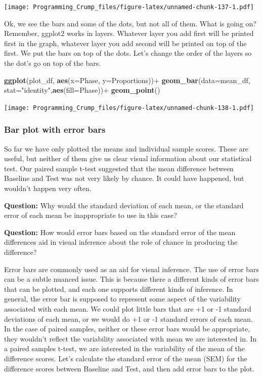 \documentclass[]{book}
\newenvironment{Shaded}{\begin{snugshade}}{\end{snugshade}}
\newcommand{\KeywordTok}[1]{\textcolor[rgb]{0.13,0.29,0.53}{\textbf{{#1}}}}
\newcommand{\DataTypeTok}[1]{\textcolor[rgb]{0.13,0.29,0.53}{{#1}}}
\newcommand{\StringTok}[1]{\textcolor[rgb]{0.31,0.60,0.02}{{#1}}}
\newcommand{\NormalTok}[1]{{#1}}
\theoremstyle{definition}
\theoremstyle{definition}
\theoremstyle{definition}
\theoremstyle{remark}
\begin{document}
\texttt{[image: Programming\_Crump\_files/figure-latex/unnamed-chunk-137-1.pdf]}

Ok, we see the bars and some of the dots, but not all of them. What is
going on? Remember, ggplot2 works in layers. Whatever layer you add
first will be printed first in the graph, whatever layer you add second
will be printed on top of the first. We put the bars on top of the dots.
Let's change the order of the layers so the dot's go on top of the bars.

\begin{Shaded}
\begin{Highlighting}[]
\KeywordTok{ggplot}\NormalTok{(plot_df, }\KeywordTok{aes}\NormalTok{(}\DataTypeTok{x=}\NormalTok{Phase, }\DataTypeTok{y=}\NormalTok{Proportions))+}\StringTok{ }
\StringTok{  }\KeywordTok{geom_bar}\NormalTok{(}\DataTypeTok{data=}\NormalTok{mean_df, }\DataTypeTok{stat=}\StringTok{"identity"}\NormalTok{,}\KeywordTok{aes}\NormalTok{(}\DataTypeTok{fill=}\NormalTok{Phase))+}
\StringTok{  }\KeywordTok{geom_point}\NormalTok{()}
\end{Highlighting}
\end{Shaded}

\texttt{[image: Programming\_Crump\_files/figure-latex/unnamed-chunk-138-1.pdf]}

\subsubsection{Bar plot with error bars}\label{bar-plot-with-error-bars}

So far we have only plotted the means and individual sample scores.
These are useful, but neither of them give us clear visual information
about our statistical test. Our paired sample t-test suggested that the
mean difference between Baseline and Test was not very likely by chance.
It could have happened, but wouldn't happen very often.

\textbf{Question:} Why would the standard deviation of each mean, or the
standard error of each mean be inappropriate to use in this case?

\textbf{Question:} How would error bars based on the standard error of
the mean differences aid in visual inference about the role of chance in
producing the difference?

Error bars are commonly used as an aid for visual inference. The use of
error bars can be a subtle nuanced issue. This is because there a
different kinds of error bars that can be plotted, and each one supports
different kinds of inference. In general, the error bar is supposed to
represent some aspect of the variability associated with each mean. We
could plot little bars that are +1 or -1 standard deviations of each
mean, or we would do +1 or -1 standard errors of each mean. In the case
of paired samples, neither or these error bars would be appropriate,
they wouldn't reflect the variability associated with mean we are
interested in. In a paired samples t-test, we are interested in the
variability of the mean of the difference scores. Let's calculate the
standard error of the mean (SEM) for the difference scores between
Baseline and Test, and then add error bars to the plot.
\end{document}

